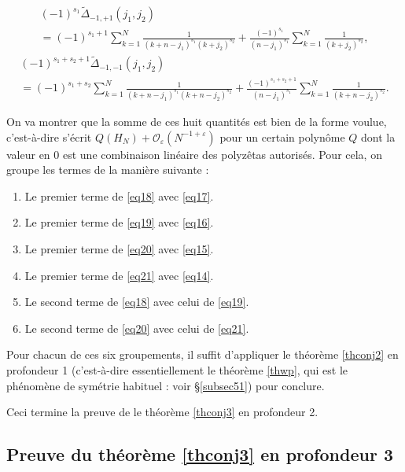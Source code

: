 \documentclass[12pt,francais, reqno]{smfart}
\numberwithin{equation}{section}
\newcommand{\gdo}{\mathcal{O}}
\newcommand{\Deltati}{\widetilde{\Delta}}
\newcommand{\eps}{\varepsilon}
\begin{document}
\begin{multline}
(-1)^{s_1} \Deltati_{-1, +1 } (j_1, j_2) 
\\
= (-1)^{s_1+1} \sum_{k= 1} ^N  \frac{1}{(k+n-j_1)^{s_1} (k+j_2)^{s_2}}  +  
\frac{(-1)^{s_1}}{(n-j_1)^{s_1}} \sum_{k=1} ^N \frac{1}{(k+j_2)^{s_2}},	\label{eq20}
\end{multline}
\begin{multline}
(-1)^{s_1+s_2+1} \Deltati_{-1, -1 } (j_1, j_2) 
\\
= (-1)^{s_1+s_2} \sum_{k= 1} ^N  \frac{1}{(k+n-j_1)^{s_1} (k+n-j_2)^{s_2}}  + 
\frac{(-1)^{s_1+s_2+1}}{(n-j_1)^{s_1}} \sum_{k=1} ^N \frac{1}{(k+n-j_2)^{s_2}}. 	\label{eq21}
\end{multline}	
												
On va montrer que la somme de ces huit quantit\'es est bien de la forme voulue, c'est-\`a-dire s'\'ecrit $Q(H_N) + \gdo_{\eps} (N^{-1+\eps})$ pour un certain polyn\^ome $Q$ dont la valeur en 0 est une combinaison lin\'eaire des polyz\^etas autoris\'es. Pour cela, on groupe les termes de la mani\`ere suivante : 
\begin{enumerate}
\item Le premier terme de  \eqref{eq18} avec \eqref{eq17}.
\item Le premier terme de  \eqref{eq19} avec \eqref{eq16}.
\item Le premier terme de  \eqref{eq20} avec \eqref{eq15}.
\item Le premier terme de  \eqref{eq21} avec \eqref{eq14}.
\item Le second terme de  \eqref{eq18} avec celui de \eqref{eq19}.
\item Le second terme de  \eqref{eq20} avec celui de \eqref{eq21}.
\end{enumerate}
Pour chacun de ces six groupements, il suffit d'appliquer le th\'eor\`eme \ref{thconj2} en profondeur 1 (c'est-\`a-dire essentiellement le th\'eor\`eme \ref{thwp}, qui est le ph\'enom\`ene de sym\'etrie habituel : voir \S \ref{subsec51}) pour conclure. 

\bigskip

Ceci termine la preuve de le th\'eor\`eme \ref{thconj3} en profondeur 2.

  
 
\subsection{Preuve du th\'eor\`eme \ref{thconj3}  en profondeur 3} \label{subsec53}
\end{document}
